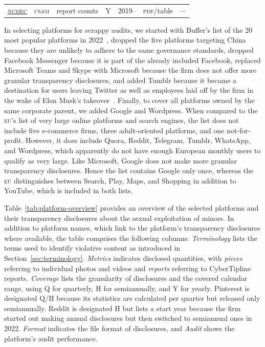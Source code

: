 \documentclass[nonacm,screen]{acmart}
\newcommand\V[1]{\textsc{\MakeLowercase{#1}}}
\begin{document}
\begin{itemize}
{\begin{table}
\begin{tabular}{@{\;}l@{\:\:}l@{\:\:}l@{\:\:}l@{\;}l@{\:\:}l@{\:\:}c@{\;}}
\href{https://www.missingkids.org/cybertiplinedata}{\V{NCMEC}}
& \V{CSAM} & report counts & Y & 2019-- & \V{PDF}/table & $\cdots$  \\
\end{tabular}
\end{table}

In selecting platforms for scrappy audits, we started with Buffer's list of the
20 most popular platforms in 2022~\cite{Lua2022}, dropped the five platforms
targeting China because they are unlikely to adhere to the same governance
standards, dropped Facebook Messenger because it is part of the already included
Facebook, replaced Microsoft Teams and Skype with Microsoft because the firm
does not offer more granular transparency disclosures, and added Tumblr because
it became a destination for users leaving Twitter as well as employees laid off
by the firm in the wake of Elon Musk's takeover~\cite{Patel2022}. Finally, to
cover all platforms owned by the same corporate parent, we added Google and
Wordpress. When compared to the \V{EU}'s list of very large online platforms and
search engines, the list does not include five e-commerce firms, three
adult-oriented platforms, and one not-for-profit. However, it does include
Quora, Reddit, Telegram, Tumblr, WhatsApp, and Wordpress, which apparently do
not have enough European monthly users to qualify as very large. Like Microsoft,
Google does not make more granular transparency disclosures. Hence the list
contains Google only once, whereas the \V{EU} distinguishes between Search,
Play, Maps, and Shopping in addition to YouTube, which is included in both
lists.

Table~\ref{tab:platform-overview} provides an overview of the selected platforms
and their transparency disclosures about the sexual exploitation of minors. In
addition to platform names, which link to the platform's transparency
disclosures where available, the table comprises the following columns:
\emph{Terminology} lists the terms used to identify violative content as
introduced in Section~\ref{sec:terminology}. \emph{Metrics} indicates disclosed
quantities, with \emph{pieces} referring to individual photos and videos and
\emph{reports} referring to CyberTipline reports. \emph{Coverage} lists the
granularity of disclosures and the covered calendar range, using Q for
quarterly, H for semiannually, and Y for yearly. Pinterest is designated Q/H
because its statistics are calculated per quarter but released only
semiannually. Reddit is designated H but lists a start year because the firm
started out making annual disclosures but then switched to semiannual ones in
2022. \emph{Format} indicates the file format of disclosures, and \emph{Audit}
shows the platform's audit performance.

}
\end{itemize}
\end{document}
